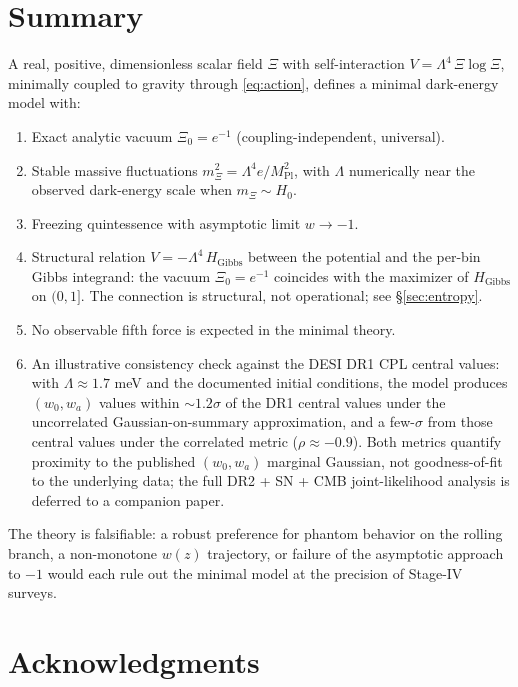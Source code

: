 \documentclass[11pt,reqno]{amsart}
\theoremstyle{plain}
\theoremstyle{definition}
\theoremstyle{remark}
\newcommand{\Pl}{\mathrm{Pl}}
\newcommand{\Gibbs}{\mathrm{Gibbs}}
\begin{document}
\section{Summary}

A real, positive, dimensionless scalar field $\Xi$ with self-interaction
$V = \Lambda^{4}\,\Xi\log\Xi$, minimally coupled to gravity through
\eqref{eq:action}, defines a minimal dark-energy model with:
\begin{enumerate}
  \item Exact analytic vacuum $\Xi_0 = e^{-1}$
        (coupling-independent, universal).
  \item Stable massive fluctuations $m_\Xi^{2} = \Lambda^{4} e / M_\Pl^{2}$,
        with $\Lambda$ numerically near the observed dark-energy scale
        when $m_\Xi \sim H_0$.
  \item Freezing quintessence with asymptotic limit $w \to -1$.
  \item Structural relation $V = -\Lambda^{4}\,H_{\Gibbs}$ between the
        potential and the per-bin Gibbs integrand: the vacuum
        $\Xi_0 = e^{-1}$ coincides with the maximizer of $H_{\Gibbs}$
        on $(0,1]$. The connection is structural, not operational; see
        \S\ref{sec:entropy}.
  \item No observable fifth force is expected in the minimal theory.
  \item An illustrative consistency check against the DESI DR1 CPL
        central values: with $\Lambda \approx 1.7$ meV and the
        documented initial conditions, the model produces
        $(w_0, w_a)$ values within $\sim 1.2\sigma$ of the DR1 central
        values under the uncorrelated Gaussian-on-summary approximation,
        and a few-$\sigma$ from those central values under the
        correlated metric ($\rho \approx -0.9$). Both metrics quantify
        proximity to the published $(w_0, w_a)$ marginal Gaussian, not
        goodness-of-fit to the underlying data; the full DR2 +
        SN + CMB joint-likelihood analysis is deferred to a companion
        paper.
\end{enumerate}
The theory is falsifiable: a robust preference for phantom behavior on
the rolling branch, a non-monotone $w(z)$ trajectory, or failure of the
asymptotic approach to $-1$ would each rule out the minimal model at the
precision of Stage-IV surveys.

\section*{Acknowledgments}
\end{document}
